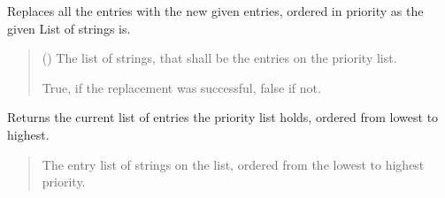 \documentclass[letterpaper,10pt,english]{sphinxmanual}
\begin{document}
\begin{fulllineitems}
\begin{fulllineitems}
\label{\detokenize{apidoc/src.osm_configurator.view.utilityframes:src.osm_configurator.view.utilityframes.tag_list_priority_frame.TagListPriorityFrame.set_tag_list}}
\pysigstartsignatures
{}
\pysigstopsignatures
\sphinxAtStartPar
Replaces all the entries with the new given entries, ordered in priority as the given List of strings is.
\begin{quote}\begin{description}
\sphinxAtStartPar
{}\sphinxstyleliteralstrong{\sphinxupquote{{[}}}\sphinxstyleliteralstrong{\sphinxupquote{{]}}} () \textendash{} The list of strings, that shall be the entries on the priority list.

\sphinxAtStartPar
True, if the replacement was successful, false if not.

\sphinxAtStartPar
{}

\end{description}\end{quote}

\end{fulllineitems}


\begin{fulllineitems}
\label{\detokenize{apidoc/src.osm_configurator.view.utilityframes:src.osm_configurator.view.utilityframes.tag_list_priority_frame.TagListPriorityFrame.get_tag_list}}
\pysigstartsignatures
{}
\pysigstopsignatures
\sphinxAtStartPar
Returns the current list of entries the priority list holds, ordered from lowest to highest.
\begin{quote}\begin{description}
\sphinxAtStartPar
The entry list of strings on the list, ordered from the lowest to highest priority.

\sphinxAtStartPar
\sphinxhref{https://docs.python.org/3.11/library/stdtypes.html\#list}{list}{[}\sphinxhref{https://docs.python.org/3.11/library/stdtypes.html\#str}{str}{]}

\end{description}\end{quote}

\end{fulllineitems}

\end{fulllineitems}
\end{document}
